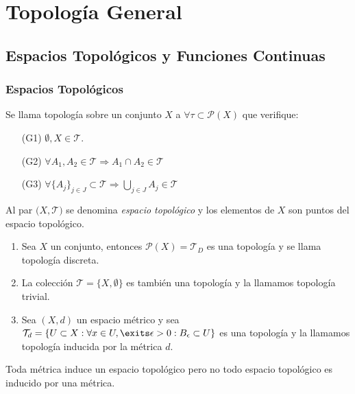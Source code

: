 \part{Topología General}
\chapter{Espacios Topológicos y Funciones Continuas}
\section{Espacios Topológicos}

\begin{defn}[Topología]
  Se llama topología sobre un conjunto $X$ a $\forall \tau \subset \mathcal{P}(X)$ que verifique:
  \begin{enumerate}[label=(\roman*)]
    \item [(G1)] $\emptyset,X \in \mathcal{T}$.
    \item [(G2)] $\forall A_{1}, A_{2} \in \mathcal{T} \Rightarrow A_{1}\cap A_{2} \in \mathcal{T}$
    \item [(G3)] $\forall \{ A_{j} \}_{j \in J} \subset \mathcal{T} \Rightarrow \bigcup_{j \in J} A_{j} \in \mathcal{T}$
  \end{enumerate}
\end{defn}

\begin{obs}
  Al par $\big( X, \mathcal{T} \big)$ se denomina \textit{espacio topológico} y los elementos de $X$ son puntos del espacio topológico.
\end{obs}

\begin{ejm}
  \begin{enumerate}[label=(\roman*)]
    \item   Sea $X$ un conjunto, entonces $\mathcal{P}(X) = \mathcal{T}_{D}$ es una topología y se llama topología discreta.
    \item  La colección $\mathcal{T} = \{ X, \emptyset \}$ es también una topología y la llamamos topología trivial.
    \item Sea $(X, d)$ un espacio métrico y sea $\mathcal{T}_{d} = \{ U \subset X : \forall x \in U, \exits \epsilon > 0 : B_{\epsilon} \subset U \}$ es una topología y la llamamos topología inducida por la métrica $d$.
  \end{enumerate}
\end{ejm}

\begin{obs}
  Toda métrica induce un espacio topológico pero no todo espacio topológico es inducido por una métrica.
\end{obs}

